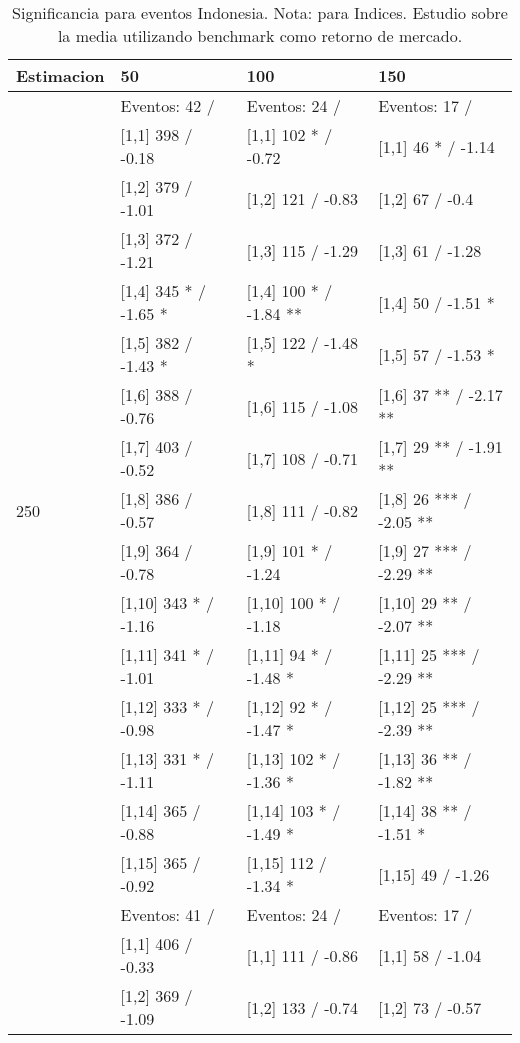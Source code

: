 \begin{table}

\caption{Significancia para eventos Indonesia. Nota: para Indices. Estudio sobre la media utilizando benchmark como retorno de mercado.}
\centering
\begin{tabular}[t]{llll}
\toprule
Estimacion & 50 & 100 & 150\\
\midrule
 & Eventos:  42 / & Eventos:  24 / & Eventos:  17 /\\
 & {}[1,1] 398  / -0.18 & {}[1,1] 102 * / -0.72 & {}[1,1] 46 * / -1.14\\
 & {}[1,2] 379  / -1.01 & {}[1,2] 121  / -0.83 & {}[1,2] 67  / -0.4\\
 & {}[1,3] 372  / -1.21 & {}[1,3] 115  / -1.29 & {}[1,3] 61  / -1.28\\
 & {}[1,4] 345 * / -1.65 * & {}[1,4] 100 * / -1.84 ** & {}[1,4] 50  / -1.51 *\\
\addlinespace
 & {}[1,5] 382  / -1.43 * & {}[1,5] 122  / -1.48 * & {}[1,5] 57  / -1.53 *\\
 & {}[1,6] 388  / -0.76 & {}[1,6] 115  / -1.08 & {}[1,6] 37 ** / -2.17 **\\
 & {}[1,7] 403  / -0.52 & {}[1,7] 108  / -0.71 & {}[1,7] 29 ** / -1.91 **\\
250 & {}[1,8] 386  / -0.57 & {}[1,8] 111  / -0.82 & {}[1,8] 26 *** / -2.05 **\\
 & {}[1,9] 364  / -0.78 & {}[1,9] 101 * / -1.24 & {}[1,9] 27 *** / -2.29 **\\
\addlinespace
 & {}[1,10] 343 * / -1.16 & {}[1,10] 100 * / -1.18 & {}[1,10] 29 ** / -2.07 **\\
 & {}[1,11] 341 * / -1.01 & {}[1,11] 94 * / -1.48 * & {}[1,11] 25 *** / -2.29 **\\
 & {}[1,12] 333 * / -0.98 & {}[1,12] 92 * / -1.47 * & {}[1,12] 25 *** / -2.39 **\\
 & {}[1,13] 331 * / -1.11 & {}[1,13] 102 * / -1.36 * & {}[1,13] 36 ** / -1.82 **\\
 & {}[1,14] 365  / -0.88 & {}[1,14] 103 * / -1.49 * & {}[1,14] 38 ** / -1.51 *\\
\addlinespace
 & {}[1,15] 365  / -0.92 & {}[1,15] 112  / -1.34 * & {}[1,15] 49  / -1.26\\
 & Eventos:  41 / & Eventos:  24 / & Eventos:  17 /\\
 & {}[1,1] 406  / -0.33 & {}[1,1] 111  / -0.86 & {}[1,1] 58  / -1.04\\
 & {}[1,2] 369  / -1.09 & {}[1,2] 133  / -0.74 & {}[1,2] 73  / -0.57\\

\end{tabular}
\end{table}
